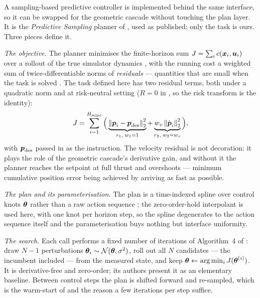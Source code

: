 A sampling-based predictive controller is
implemented behind the same interface, so it can be swapped for the geometric cascade without
touching the plan layer. It is the \emph{Predictive Sampling} planner of \parencite{howell2022predictive}, used
as published; only the task is ours. Three pieces define it.

\emph{The objective.} The planner minimises the finite-horizon sum
$J = \sum_{i} c(\boldsymbol{x}_{i},\boldsymbol{u}_{i})$ over a rollout of the true simulator dynamics
\parencite[Eq.~(3)]{howell2022predictive}, with the running cost a weighted sum of twice-differentiable
norms of \emph{residuals} --- quantities that are small when the task is solved
\parencite[Eq.~(4)]{howell2022predictive}. The task defined here has two residual terms, both under a
quadratic norm and at risk-neutral setting ($R = 0$ in
\parencite[Eq.~(5)]{howell2022predictive}, so the risk transform is the identity):
\begin{equation}\label{eq:method:dep:mjpc}
  J = \sum_{i=1}^{H_{\textrm{mjpc}}}
      \Big(\underbrace{\left\|\boldsymbol{p}_{i}-\boldsymbol{p}_{\textrm{des}}\right\|_{2}^{2}}_{r_{1},\;w_{1}=1}
      + \underbrace{w_{v}\left\|\dot{\boldsymbol{p}}_{i}\right\|_{2}^{2}}_{r_{2},\;w_{2}=w_{v}}\Big),
\end{equation}
with $\boldsymbol{p}_{\textrm{des}}$ passed in as the instruction. The velocity residual is not decoration: it
plays the role of the geometric cascade's derivative gain, and without it the planner reaches the setpoint at
full thrust and overshoots --- minimum cumulative position error being achieved by arriving as fast
as possible.

\emph{The plan and its parameterisation.} The plan is a time-indexed spline over control knots
$\boldsymbol{\theta}$ rather than a raw action sequence \parencite[\S3.3]{howell2022predictive}; the
zero-order-hold interpolant is used here, with one knot per horizon step, so the spline degenerates
to the action sequence itself and the parameterisation buys nothing but interface uniformity.

\emph{The search.} Each call performs a fixed number of iterations of Algorithm~4 of
\parencite{howell2022predictive}: draw $N-1$ perturbations
$\boldsymbol{\theta}_{i} \sim \mathcal{N}(\boldsymbol{\theta},\sigma^{2})$, roll out all $N$ candidates --- the
incumbent included --- from the measured state, and keep
$\boldsymbol{\theta} \leftarrow \arg\min_{i} J(\boldsymbol{\theta}^{(i)})$. It is derivative-free and zero-order;
its authors present it as an elementary baseline. Between control steps the plan is shifted forward
and re-sampled, which is the warm-start of
\parencite[Alg.~1]{howell2022predictive} and the reason a few iterations per step suffice.

